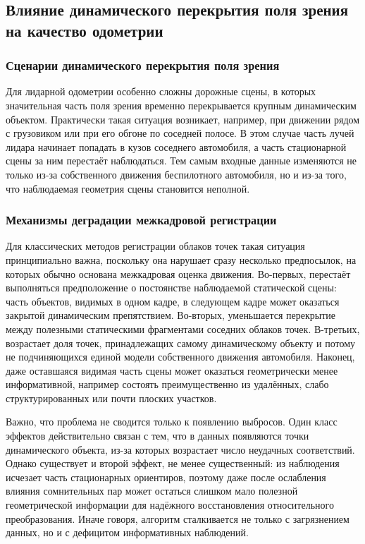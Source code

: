 \subsection{Влияние динамического перекрытия поля зрения на качество одометрии}
\label{sec:1-3-dynamic-overlap}

\subsubsection{Сценарии динамического перекрытия поля зрения}

Для лидарной одометрии особенно сложны дорожные сцены, в которых значительная часть поля зрения временно перекрывается крупным динамическим объектом. Практически такая ситуация возникает, например, при движении рядом с грузовиком или при его обгоне по соседней полосе. В этом случае часть лучей лидара начинает попадать в кузов соседнего автомобиля, а часть стационарной сцены за ним перестаёт наблюдаться. Тем самым входные данные изменяются не только из-за собственного движения беспилотного автомобиля, но и из-за того, что наблюдаемая геометрия сцены становится неполной.

\subsubsection{Механизмы деградации межкадровой регистрации}

Для классических методов регистрации облаков точек такая ситуация принципиально важна, поскольку она нарушает сразу несколько предпосылок, на которых обычно основана межкадровая оценка движения. Во-первых, перестаёт выполняться предположение о постоянстве наблюдаемой статической сцены: часть объектов, видимых в одном кадре, в следующем кадре может оказаться закрытой динамическим препятствием. Во-вторых, уменьшается перекрытие между полезными статическими фрагментами соседних облаков точек. В-третьих, возрастает доля точек, принадлежащих самому динамическому объекту и потому не подчиняющихся единой модели собственного движения автомобиля. Наконец, даже оставшаяся видимая часть сцены может оказаться геометрически менее информативной, например состоять преимущественно из удалённых, слабо структурированных или почти плоских участков.

Важно, что проблема не сводится только к появлению выбросов. Один класс эффектов действительно связан с тем, что в данных появляются точки динамического объекта, из-за которых возрастает число неудачных соответствий. Однако существует и второй эффект, не менее существенный: из наблюдения исчезает часть стационарных ориентиров, поэтому даже после ослабления влияния сомнительных пар может остаться слишком мало полезной геометрической информации для надёжного восстановления относительного преобразования. Иначе говоря, алгоритм сталкивается не только с загрязнением данных, но и с дефицитом информативных наблюдений.


